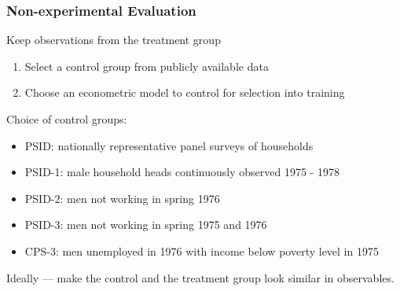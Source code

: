 \documentclass[notes=show,beamer,compress]{beamer}
\begin{document}





\begin{frame}
\frametitle{Non-experimental Evaluation}

Keep observations from the treatment group
\begin{enumerate}
\item Select a control group from publicly available data
\item Choose an econometric model to control for selection into training
\end{enumerate}

Choice of control groups:
\begin{itemize}
\item PSID: nationally representative panel surveys of households
\item PSID-1: male household heads continuously observed 1975 - 1978
\item PSID-2: men not working in spring 1976
\item PSID-3: men not working in spring 1975 and 1976
\item CPS-3: men unemployed in 1976 with income below poverty level in 1975
\end{itemize}
Ideally --- make the control and the treatment group look similar in observables.

\end{frame}
\end{document}
